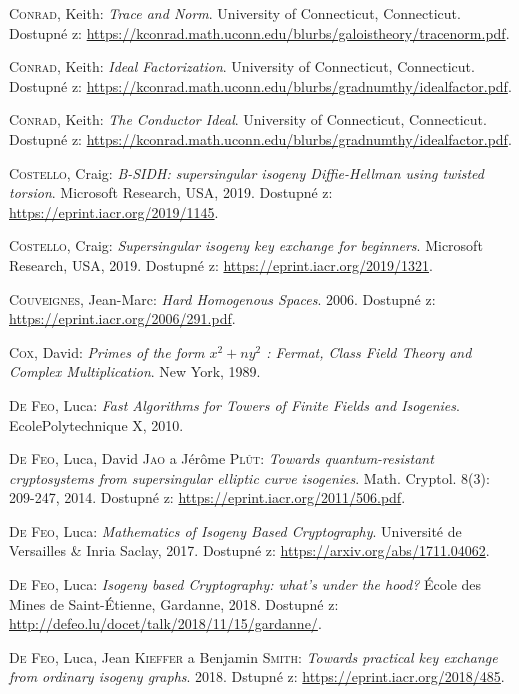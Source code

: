 \documentclass[12pt]{report}
\begin{document}
\begin{thebibliography}{97}
\textsc{Conrad}, Keith: \textit{Trace and Norm}. University of Connecticut, Connecticut. Dostupné z: \url{https://kconrad.math.uconn.edu/blurbs/galoistheory/tracenorm.pdf}.

\textsc{Conrad}, Keith: \textit{Ideal Factorization}. University of Connecticut, Connecticut. Dostupné z: \url{https://kconrad.math.uconn.edu/blurbs/gradnumthy/idealfactor.pdf}.

\textsc{Conrad}, Keith: \textit{The Conductor Ideal}. University of Connecticut, Connecticut. Dostupné z: \url{https://kconrad.math.uconn.edu/blurbs/gradnumthy/idealfactor.pdf}.

\textsc{Costello}, Craig: \textit{B-SIDH: supersingular isogeny Diffie-Hellman using twisted torsion}. Microsoft Research, USA, 2019. Dostupné z: \url{https://eprint.iacr.org/2019/1145}.

\textsc{Costello}, Craig: \textit{Supersingular isogeny key exchange for beginners}. Microsoft Research, USA, 2019. Dostupné z: \url{https://eprint.iacr.org/2019/1321}.


\textsc{Couveignes}, Jean-Marc: \textit{Hard Homogenous Spaces}. 2006. Dostupné z: \url{https://eprint.iacr.org/2006/291.pdf}.

\textsc{Cox}, David: \textit{Primes of the form $x^2+n y^2$ : Fermat, Class Field Theory and Complex Multiplication}. New York, 1989.

\textsc{De Feo}, Luca: \textit{Fast Algorithms for Towers of Finite Fields and Isogenies}. EcolePolytechnique X, 2010.

\textsc{De Feo}, Luca, David \textsc{Jao} a Jérôme \textsc{Plût}: \textit{Towards quantum-resistant cryptosystems from supersingular elliptic curve isogenies}. Math. Cryptol. 8(3): 209-247, 2014. Dostupné z: \url{https://eprint.iacr.org/2011/506.pdf}.

\textsc{De Feo}, Luca: \textit{Mathematics of Isogeny Based Cryptography}. Université de Versailles \& Inria Saclay, 2017. Dostupné z: \url{https://arxiv.org/abs/1711.04062}.

\textsc{De Feo}, Luca: \textit{Isogeny based Cryptography: what’s under the hood?} École des Mines de Saint-Étienne, Gardanne, 2018. Dostupné z: \url{http://defeo.lu/docet/talk/2018/11/15/gardanne/}.

\textsc{De Feo}, Luca, Jean \textsc{Kieffer} a Benjamin \textsc{Smith}: \textit{Towards practical key exchange from ordinary isogeny graphs}. 2018. Dstupné z: \url{https://eprint.iacr.org/2018/485}.


\end{thebibliography}
\end{document}

